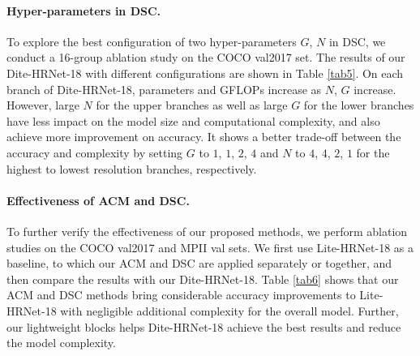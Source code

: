 \documentclass{article}
\begin{document}
\begin{table}[t]
\centering
{}
\caption{Ablation studies on the COCO val2017 and MPII val sets. The MFLOPs is computed with the input size $256 \times 192$ for the COCO val2017 set and $256 \times 256$ for the MPII val set, respectively. }
\label{tab6}
\end{table}

\paragraph{Hyper-parameters in DSC.} To explore the best configuration of two hyper-parameters $G$, $N$ in DSC, we conduct a 16-group ablation study on the COCO val2017 set. The results of our Dite-HRNet-18 with different configurations are shown in Table \ref{tab5}. On each branch of Dite-HRNet-18, parameters and GFLOPs increase as $N$, $G$ increase. However, large $N$ for the upper branches as well as large $G$ for the lower branches have less impact on the model size and computational complexity, and also achieve more improvement on accuracy. It shows a better trade-off between the accuracy and complexity by setting $G$ to $1$, $1$, $2$, $4$ and $N$ to $4$, $4$, $2$, $1$ for the highest to lowest resolution branches, respectively.

\paragraph{Effectiveness of ACM and DSC.} To further verify the effectiveness of our proposed methods, we perform ablation studies on the COCO val2017 and MPII val sets. We first use Lite-HRNet-18 \cite{yu:litehrnet} as a baseline, to which our ACM and DSC are applied separately or together, and then compare the results with our Dite-HRNet-18. Table \ref{tab6} shows that our ACM and DSC methods bring considerable accuracy improvements to Lite-HRNet-18 with negligible additional complexity for the overall model. Further, our lightweight blocks helps Dite-HRNet-18 achieve the best results and reduce the model complexity.
\end{document}
